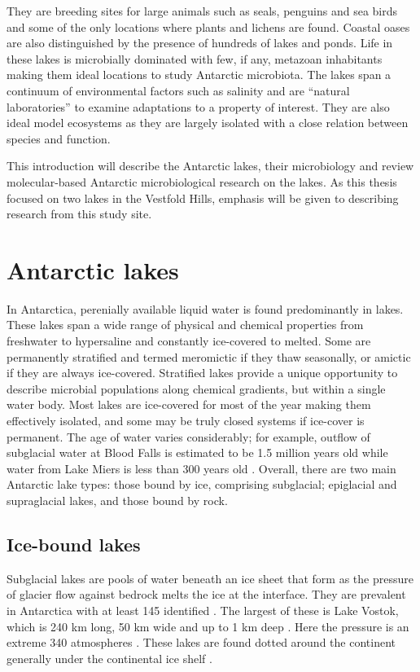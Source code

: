They are breeding sites for large animals such as seals, penguins and sea birds and some of the only locations where plants and lichens are found.
Coastal oases are also distinguished by the presence of hundreds of lakes and ponds.
Life in these lakes is microbially dominated with few, if any, metazoan inhabitants \cite{Laybourne-Parry1997} making them ideal locations to study Antarctic microbiota. 
The lakes span a continuum of environmental factors such as salinity and are ``natural laboratories'' to examine adaptations to a property of interest. 
They are also ideal model ecosystems as they are largely isolated with a close relation between species and function.

This introduction will describe the Antarctic lakes, their microbiology and review molecular-based Antarctic microbiological research on the lakes.
As this thesis focused on two lakes in the Vestfold Hills, emphasis will be given to describing research from this study site.


\section{Antarctic lakes}
In Antarctica, perenially available liquid water is found predominantly in lakes. 
These lakes span a wide range of physical and chemical properties from freshwater to hypersaline and constantly ice-covered to melted.
Some are permanently stratified and termed meromictic if they thaw seasonally, or amictic if they are always ice-covered.
Stratified lakes provide a unique opportunity to describe microbial populations along chemical gradients, but within a single water body. 
Most lakes are ice-covered for most of the year making them effectively isolated, and some may be truly closed systems if ice-cover is permanent.
The age of water varies considerably; for example, outflow of subglacial water at Blood Falls is estimated to be 1.5 million years old \cite{Mikucki2009} while water from Lake Miers is less than 300 years old \cite{Green1988}. 
Overall, there are two main Antarctic lake types: those bound by ice, comprising subglacial; epiglacial and supraglacial lakes, and those bound by rock.

\subsection{Ice-bound lakes}
Subglacial lakes are pools of water beneath an ice sheet that form as the pressure of glacier flow against bedrock melts the ice at the interface. 
They are prevalent in Antarctica with at least 145 identified \cite{Siegert2005}.
The largest of these is Lake Vostok, which is 240 km long, 50 km wide and up to 1 km deep \cite{Siegert2001}.
Here the pressure is an extreme 340 atmospheres \cite{Siegert2001}.
These lakes are found dotted around the continent generally under the continental ice shelf \cite{Siegert2001}.%

